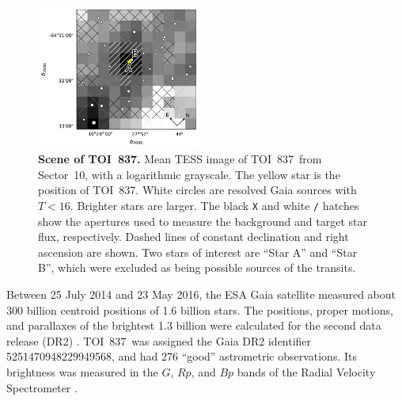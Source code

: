 \documentclass[12pt,twocolumn,tighten]{aastex63}
\newcommand{\tn}{TOI~837} %
\begin{document}
\begin{figure}[!t]
	\begin{center}
		\leavevmode
		\includegraphics[width=0.48\textwidth]{f2.pdf}
	\end{center}
	\vspace{-0.7cm}
	\caption{ {\bf Scene of \tn.}
    Mean TESS image of \tn\ from Sector~10, with a logarithmic
    grayscale. The yellow star is the position of \tn.  White circles
    are resolved Gaia sources with $T<16$. Brighter stars are larger.
    The black \texttt{X} and white \texttt{/} hatches show the
    apertures used to measure the background and target star flux,
    respectively. Dashed lines of constant declination and right
    ascension are shown.  Two stars of interest are ``Star A'' and
    ``Star B'', which were excluded as being possible
    sources of the transits.
		\label{fig:scene}
	}
\end{figure}

Between 25 July 2014 and 23 May 2016, the ESA Gaia satellite measured
about 300 billion centroid positions of 1{.}6 billion stars.  The
positions, proper motions, and parallaxes of the brightest 1{.}3
billion were calculated for the second data release (DR2)
\citep{gaia_collaboration_gaia_2016,lindegren_gaiasoln_2018,gaia_collaboration_gaia_2018}.
\tn\ was assigned the Gaia DR2 identifier 5251470948229949568, and had
276 ``good'' astrometric observations. Its brightness was measured in
the $G$, $Rp$, and $Bp$ bands of the Radial Velocity Spectrometer
\citep{cropper_gaia_2018,evans_gaia_2018}.  
\end{document}
